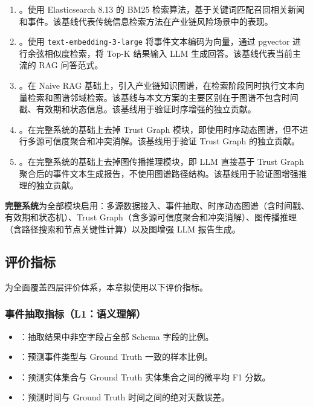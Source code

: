 \begin{enumerate}
    \item {}。使用 Elasticsearch 8.13 的 BM25 检索算法，基于关键词匹配召回相关新闻和事件。该基线代表传统信息检索方法在产业链风险场景中的表现。
    \item {}。使用 \texttt{text-embedding-3-large} 将事件文本编码为向量，通过 pgvector 进行余弦相似度检索，将 Top-K 结果输入 LLM 生成回答。该基线代表当前主流的 RAG 问答范式。
    \item {}。在 Naive RAG 基础上，引入产业链知识图谱，在检索阶段同时执行文本向量检索和图谱邻域检索。该基线与本文方案的主要区别在于图谱不包含时间戳、有效期和状态信息。该基线用于验证时序增强的独立贡献。
    \item {}。在\projectshort 完整系统的基础上去掉 Trust Graph 模块，即使用时序动态图谱，但不进行多源可信度聚合和冲突消解。该基线用于验证 Trust Graph 的独立贡献。
    \item {}。在\projectshort 完整系统的基础上去掉图传播推理模块，即 LLM 直接基于 Trust Graph 聚合后的事件文本生成报告，不使用图谱路径结构。该基线用于验证图增强推理的独立贡献。
\end{enumerate}

\textbf{完整系统}为\projectshort 全部模块启用：多源数据接入、事件抽取、时序动态图谱（含时间戳、有效期和状态机）、Trust Graph（含多源可信度聚合和冲突消解）、图传播推理（含路径搜索和节点关键性计算）以及图增强 LLM 报告生成。

\subsection{评价指标}
\label{sec:exp-metrics}

为全面覆盖四层评价体系，本章拟使用以下评价指标。

\subsubsection{事件抽取指标（L1：语义理解）}

\begin{itemize}
    \item {}：抽取结果中非空字段占全部 Schema 字段的比例。
    \item {}：预测事件类型与 Ground Truth 一致的样本比例。
    \item {}：预测实体集合与 Ground Truth 实体集合之间的微平均 F1 分数。
    \item {}：预测时间与 Ground Truth 时间之间的绝对天数误差。
\end{itemize}

